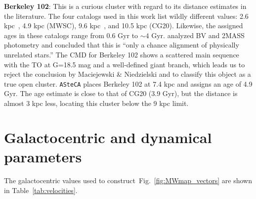 \documentclass{aa}
\begin{document}
\begin{appendix}
  \noindent \textbf{Berkeley 102}: This is a curious cluster with regard to its distance
  estimates in the literature. The four catalogs used in this work list wildly
  different values: 2.6 kpc~\citep[WEBDA;][]{Tadross_2008}, 4.9 kpc (MWSC),
  9.6 kpc~\citep[OC02;][]{Hasegawa_2008}, and  10.5 kpc (CG20). Likewise, the
  assigned ages in these catalogs range from 0.6 Gyr to $\sim4$ Gyr.
  \cite{Maciejewski_2008} analyzed BV and 2MASS photometry and concluded that
  this is {``only a chance alignment of physically unrelated stars.''}
  The CMD for Berkeley 102 shows a scattered main sequence with the TO at G=18.5
  mag and a well-defined giant branch, which leads us to reject the conclusion
  by Maciejewski \& Niedzielski and to classify this object as a true open cluster.
  \texttt{ASteCA} places Berkeley 102 at 7.4 kpc and assigns an age of 4.9 Gyr.
  The age estimate is close to that of CG20 (3.9 Gyr), but the distance is
  almost 3 kpc less, locating this cluster below the 9 kpc limit.\\


\FloatBarrier
\section{Galactocentric and dynamical parameters}
  \label{app:galac_dynam}

  The galactocentric values used to construct~Fig.~\ref{fig:MWmap_vectors} are shown
  in Table~\ref{tab:velocities}.


\end{appendix}
\end{document}
